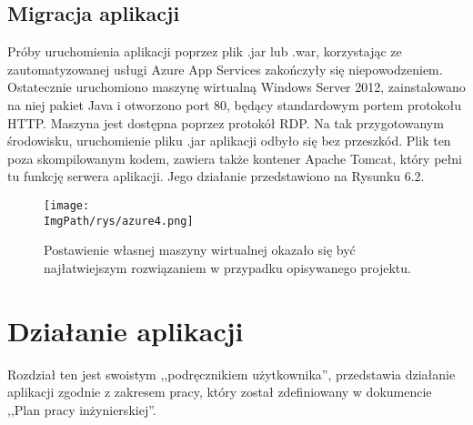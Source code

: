\documentclass[a4paper,12pt,twoside,openany]{report}
\newcommand{\ImgPath}{.}
\begin{document}
\section{Migracja aplikacji}
Próby uruchomienia aplikacji poprzez plik .jar lub .war, korzystając ze zautomatyzowanej usługi Azure App Services zakończyły się niepowodzeniem. Ostatecznie uruchomiono maszynę wirtualną Windows Server 2012, zainstalowano na niej pakiet Java i otworzono port 80, będący standardowym portem protokołu HTTP. Maszyna jest dostępna poprzez protokół RDP. Na tak przygotowanym środowisku, uruchomienie pliku .jar aplikacji odbyło się bez przeszkód. Plik ten poza skompilowanym kodem, zawiera także kontener Apache Tomcat, który pełni tu funkcję serwera aplikacji. Jego działanie przedstawiono na Rysunku 6.2.
				\begin{figure}[!htbp]
					\begin{center}
						\centering
						\texttt{[image: \\ImgPath/rys/azure4.png]}
					\end{center}
					\caption{Postawienie własnej maszyny wirtualnej okazało się być najłatwiejszym rozwiązaniem w przypadku opisywanego projektu.}
					\label{UMLTS}
				\end{figure}
\chapter{Działanie aplikacji}
Rozdział ten jest swoistym ,,podręcznikiem użytkownika'', przedstawia działanie aplikacji zgodnie z zakresem pracy, który został zdefiniowany w dokumencie ,,Plan pracy inżynierskiej''.
\end{document}
